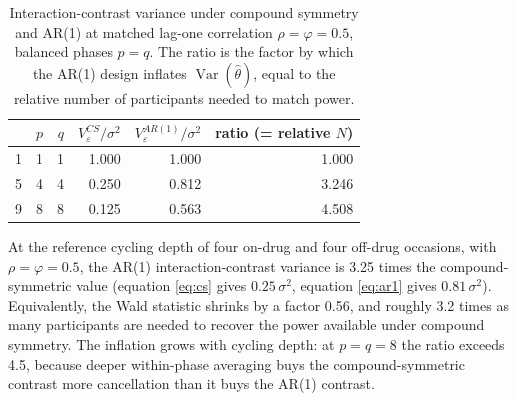 \documentclass[
  11pt,
]{article}
\newenvironment{Shaded}{\begin{snugshade}}{\end{snugshade}}
\newcommand{\AttributeTok}[1]{\textcolor[rgb]{0.13,0.29,0.53}{#1}}
\newcommand{\ConstantTok}[1]{\textcolor[rgb]{0.56,0.35,0.01}{#1}}
\newcommand{\DecValTok}[1]{\textcolor[rgb]{0.00,0.00,0.81}{#1}}
\newcommand{\NormalTok}[1]{#1}
\newcommand{\SpecialCharTok}[1]{\textcolor[rgb]{0.81,0.36,0.00}{\textbf{#1}}}
\newcommand{\StringTok}[1]{\textcolor[rgb]{0.31,0.60,0.02}{#1}}
\begin{document}
\begin{Shaded}
\end{Shaded}

\begin{table}

\caption{\label{tab:calc}Interaction-contrast variance under compound symmetry
    and AR(1) at matched lag-one correlation $\rho=\varphi=0.5$,
    balanced phases $p=q$. The ratio is the factor by which the AR(1)
    design inflates $\operatorname{Var}(\hat\theta)$, equal to the
    relative number of participants needed to match power.}
\centering
\begin{tabular}[t]{l|r|r|r|r|r}
\hline
  & $p$ & $q$ & $V^{CS}_\varepsilon/\sigma^2$ & $V^{AR(1)}_\varepsilon/\sigma^2$ & ratio (= relative $N$)\\
\hline
1 & 1 & 1 & 1.000 & 1.000 & 1.000\\
\hline
5 & 4 & 4 & 0.250 & 0.812 & 3.246\\
\hline
9 & 8 & 8 & 0.125 & 0.563 & 4.508\\
\hline
\end{tabular}
\end{table}

At the reference cycling depth of four on-drug and four off-drug
occasions, with \(\rho = \varphi = 0.5\), the AR(1) interaction-contrast
variance is 3.25 times the compound-symmetric
value (equation \eqref{eq:cs} gives \(0.25\,\sigma^2\), equation
\eqref{eq:ar1} gives \(0.81\,\sigma^2\)). Equivalently, the Wald
statistic shrinks by a factor 0.56, and
roughly 3.2 times as many participants are needed
to recover the power available under compound symmetry. The inflation
grows with cycling depth: at \(p = q = 8\) the ratio exceeds
4.5, because
deeper within-phase averaging buys the compound-symmetric contrast
more cancellation than it buys the AR(1) contrast.
\end{document}
